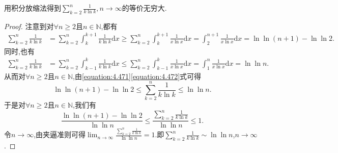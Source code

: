 \documentclass[../../main.tex]{subfiles}
\begin{document}
\begin{example}
用积分放缩法得到\(\sum_{k = 2}^{n}\frac{1}{k\ln k},n\to\infty\)的等价无穷大.
\end{example}
\begin{proof}
注意到对\(\forall n\geqslant 2\)且\(n\in\mathbb{N}\),都有
\begin{align}\label{equation:4.471}
\sum_{k = 2}^n\frac{1}{k\ln k}&=\sum_{k = 2}^n\int_{k}^{k + 1}\frac{1}{k\ln k}\mathrm{d}x
\geqslant\sum_{k = 2}^n\int_{k}^{k + 1}\frac{1}{x\ln x}\mathrm{d}x
=\int_{2}^{n + 1}\frac{1}{x\ln x}\mathrm{d}x
=\ln\ln(n + 1) - \ln\ln 2.
\end{align}
同时,也有
\begin{align}\label{equation:4.472}
\sum_{k = 2}^n\frac{1}{k\ln k}&=\sum_{k = 2}^n\int_{k - 1}^{k}\frac{1}{k\ln k}\mathrm{d}x
\leqslant\sum_{k = 2}^n\int_{k - 1}^{k}\frac{1}{x\ln x}\mathrm{d}x
=\int_{1}^{n}\frac{1}{x\ln x}\mathrm{d}x
=\ln\ln n.
\end{align}
从而对\(\forall n\geqslant 2\)且\(n\in\mathbb{N}\),由\eqref{equation:4.471}\eqref{equation:4.472}式可得
\[
\ln\ln(n + 1) - \ln\ln 2\leqslant\sum_{k = 2}^n\frac{1}{k\ln k}\leqslant\ln\ln n.
\]
于是对\(\forall n\geqslant 2\)且\(n\in\mathbb{N}\),我们有
\[
\frac{\ln\ln(n + 1) - \ln\ln 2}{\ln\ln n}\leqslant\frac{\sum\limits_{k = 2}^n\frac{1}{k\ln k}}{\ln\ln n}\leqslant 1.
\]
令\(n\rightarrow\infty\),由夹逼准则可得\(\lim_{n\rightarrow\infty}\frac{\sum\limits_{k = 2}^n\frac{1}{k\ln k}}{\ln\ln n}=1\).即\(\sum_{k = 2}^n\frac{1}{k\ln k}\sim\ln\ln n\),\(n\rightarrow\infty\).
\end{proof}
\end{document}
